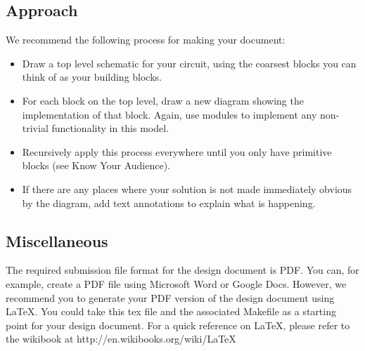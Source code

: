 \documentclass[10pt]{article}
\begin{document}
\subsection{Approach}
We recommend the following process for making your document:
\begin{itemize}
\item Draw a top level schematic for your circuit, using the coarsest blocks you can think of as your
building blocks.
\item For each block on the top level, draw a new diagram showing the implementation of that
block. Again, use modules to implement any non-trivial functionality in this model.
\item Recursively apply this process everywhere until you only have primitive blocks (see Know
Your Audience).
\item If there are any places where your solution is not made immediately obvious by the diagram,
add text annotations to explain what is happening.
\end{itemize}

\subsection{Miscellaneous}
The required submission file format for the design document is PDF.
You can, for example, create a PDF file using Microsoft Word or Google Docs. However,
we recommend you to generate your PDF version of the design document using \LaTeX. You could
take this tex file and the associated Makefile as a starting point for your
design document. For a quick reference on \LaTeX, please refer to the wikibook at
http://en.wikibooks.org/wiki/LaTeX
\end{document}
